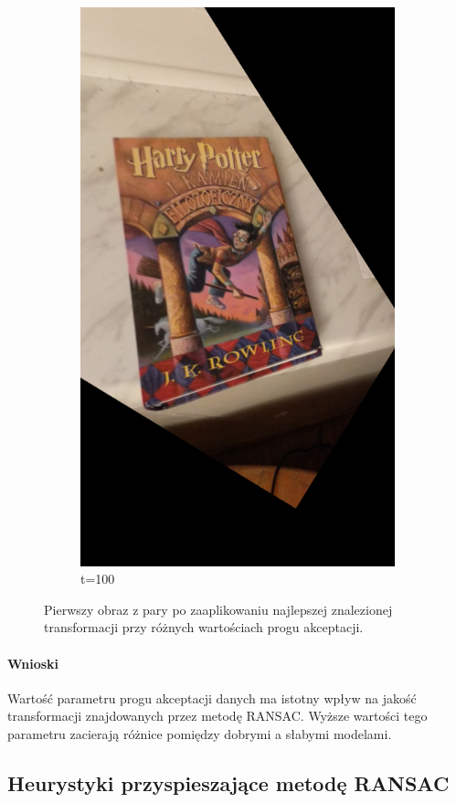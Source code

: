 \documentclass{article}
\begin{document}
\begin{figure}[H]
\begin{subfigure}[b]{0.3\linewidth}
			\includegraphics[width=\linewidth]{p100t.png}
			\caption{t=100}
		\end{subfigure}
		\caption{Pierwszy obraz z pary po zaaplikowaniu najlepszej znalezionej transformacji przy różnych wartościach progu akceptacji.}
		\label{fig:thresh2}
	\end{figure}
	
	\paragraph{Wnioski}
	Wartość parametru progu akceptacji danych ma istotny wpływ na jakość transformacji znajdowanych przez metodę RANSAC. Wyższe wartości tego parametru zacierają różnice pomiędzy dobrymi a słabymi modelami.
	\subsection{Heurystyki przyspieszające metodę RANSAC}
	
	
\end{document}
